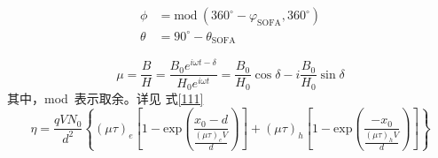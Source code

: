\begin{align}
	\label{111}
	\phi & = \text{mod}~\left( 360^{\circ}-\varphi_{\text{SOFA}}, 360^{\circ} \right)  \nonumber \\
	\theta & =  90^{\circ} - \theta_{\text{SOFA}} 	
\end{align}

\[
\mu = \frac{B}{H}=\frac{B_0 e^{i\omega t-\delta}}{H_0 e^{i\omega t}}=\frac{B_0}{H_0}\cos\delta-i\frac{B_0}{H_0}\sin\delta
\]
其中，mod~表示取余。详见 式\ref{111}
\begin{equation}
\eta = \frac{qVN_0}{d^2}\left\{(\mu\tau)_e \left[1-\text{exp}\left(\frac{x_0-d}{\frac{(\mu\tau)_e V}{d}}\right)\right]+(\mu\tau)_h \left[1-\text{exp}\left(\frac{-x_0}{\frac{(\mu\tau)_h V}{d}}\right)\right]\right\}
\end{equation}
